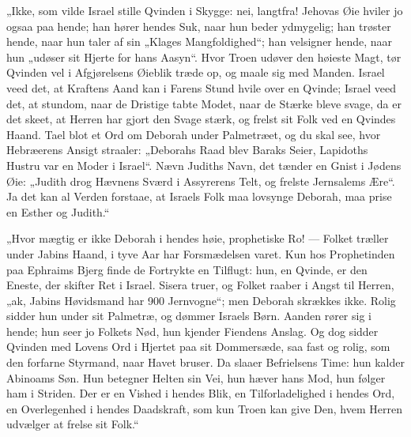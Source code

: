 \documentclass[12pt,a4paper]{book}
\begin{document}
„Ikke, som vilde Israel stille Qvinden i Skygge: nei, langtfra! Jehovas Øie
hviler jo ogsaa paa hende; han hører hendes Suk, naar hun beder ydmygelig; han
trøster hende, naar hun taler af sin „Klages Mangfoldighed“; han velsigner
hende, naar hun „udøser sit Hjerte for hans Aasyn“. Hvor Troen udøver den
høieste Magt, tør Qvinden vel i Afgjørelsens Øieblik træde op, og maale sig med
Manden. Israel veed det, at Kraftens Aand kan
i Farens Stund hvile over en Qvinde; Israel veed det, at stundom, naar de
Dristige tabte Modet, naar de Stærke bleve svage, da er det skeet, at Herren har
gjort den Svage stærk, og frelst sit Folk ved en Qvindes Haand. Tael blot et Ord
om Deborah under Palmetræet, og du skal see, hvor Hebræerens Ansigt straaler:
„Deborahs Raad blev Baraks Seier, Lapidoths Hustru var en Moder i Israel“. Nævn
Judiths Navn, det tænder en Gnist i Jødens Øie: „Judith drog Hævnens Sværd i
Assyrerens Telt, og frelste Jernsalems Ære“. Ja det kan al Verden forstaae, at
Israels Folk maa lovsynge Deborah, maa prise en Esther og Judith.“

„Hvor mægtig er ikke Deborah i hendes høie, prophetiske Ro! --- Folket træller
under Jabins Haand, i tyve Aar har Forsmædelsen varet. Kun hos Prophetinden paa
Ephraims Bjerg finde de Fortrykte en Tilflugt: hun, en Qvinde, er den Eneste,
der skifter Ret i Israel. Sisera truer, og Folket raaber i Angst til Herren,
„ak, Jabins Høvidsmand har 900 Jernvogne“; men Deborah skrækkes ikke. Rolig
sidder hun under sit Palmetræ, og dømmer Israels Børn. Aanden rører sig i hende;
hun seer jo Folkets Nød, hun kjender Fiendens Anslag. Og dog sidder Qvinden med
Lovens Ord i Hjertet paa sit Dommersæde, saa fast og rolig, som den forfarne
Styrmand, naar Havet bruser. Da slaaer Befrielsens Time: hun kalder Abinoams
Søn. Hun betegner Helten sin Vei, hun hæver hans Mod, hun følger ham i Striden.
Der er en Vished i hendes Blik, en Tilforladelighed i hendes Ord, en
Overlegenhed i hendes Daadskraft, som kun Troen kan give Den, hvem Herren
udvælger at frelse sit Folk.“
\end{document}
